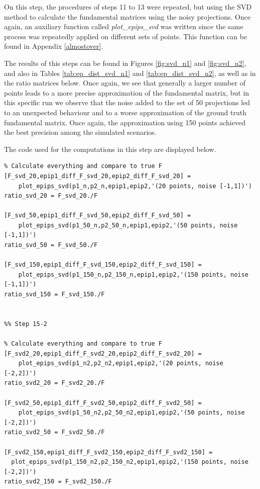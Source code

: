 \documentclass[peerreview,11pt]{IEEEtran}
\begin{document}
On this step, the procedures of steps 11 to 13 were repeated, but using the SVD method to calculate the fundamental matrices using the noisy projections. Once again, an auxiliary function called \textit{plot\_epips\_svd} was written since the same process was repeatedly applied on different sets of points. This function can be found in Appendix \ref{almostover}.

The results of this steps can be found in Figures \ref{fig:svd_n1} and \ref{fig:svd_n2}, and also in Tables \ref{tab:ep_dist_svd_n1} and \ref{tab:ep_dist_svd_n2}, as well as in the ratio matrices below. Once again, we see that generally a larger number of points leads to a more precise approximation of the fundamental matrix, but in this specific run we observe that the noise added to the set of 50 projections led to an unexpected behaviour and to a worse approximation of the ground truth fundamental matrix. Once again, the approximation using 150 points achieved the best precision among the simulated scenarios.

The code used for the computations in this step are displayed below.

\begin{verbatim}
% Calculate everything and compare to true F
[F_svd_20,epip1_diff_F_svd_20,epip2_diff_F_svd_20] =
    plot_epips_svd(p1_n,p2_n,epip1,epip2,'(20 points, noise [-1,1])')
ratio_svd_20 = F_svd_20./F

[F_svd_50,epip1_diff_F_svd_50,epip2_diff_F_svd_50] =
    plot_epips_svd(p1_50_n,p2_50_n,epip1,epip2,'(50 points, noise [-1,1])')
ratio_svd_50 = F_svd_50./F

[F_svd_150,epip1_diff_F_svd_150,epip2_diff_F_svd_150] =
    plot_epips_svd(p1_150_n,p2_150_n,epip1,epip2,'(150 points, noise [-1,1])')
ratio_svd_150 = F_svd_150./F


%% Step 15-2

% Calculate everything and compare to true F
[F_svd2_20,epip1_diff_F_svd2_20,epip2_diff_F_svd2_20] =
    plot_epips_svd(p1_n2,p2_n2,epip1,epip2,'(20 points, noise [-2,2])')
ratio_svd2_20 = F_svd2_20./F

[F_svd2_50,epip1_diff_F_svd2_50,epip2_diff_F_svd2_50] =
    plot_epips_svd(p1_50_n2,p2_50_n2,epip1,epip2,'(50 points, noise [-2,2])')
ratio_svd2_50 = F_svd2_50./F

[F_svd2_150,epip1_diff_F_svd2_150,epip2_diff_F_svd2_150] =
  plot_epips_svd(p1_150_n2,p2_150_n2,epip1,epip2,'(150 points, noise [-2,2])')
ratio_svd2_150 = F_svd2_150./F
\end{verbatim}
\end{document}
